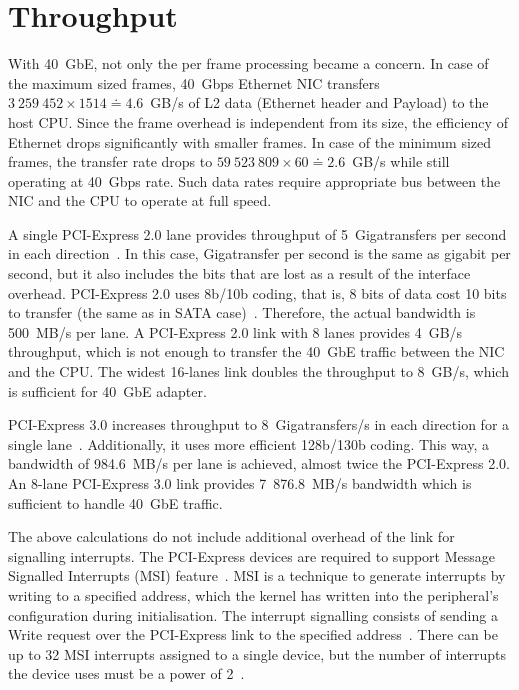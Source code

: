 
\section{Throughput}\label{sec:40gbe-throughput}
With 40~GbE, not only the per frame processing became a concern.
In case of the maximum sized frames,
40~Gbps Ethernet NIC transfers $3~259~452 \times 1514 \doteq 4.6$~GB/s of L2 data
(Ethernet header and Payload) to the host CPU.
Since the frame overhead is independent from its size,
the efficiency of Ethernet drops significantly with smaller frames.
In case of the minimum sized frames, the transfer rate drops to $59~523~809 \times 60 \doteq 2.6$~GB/s
while still operating at 40~Gbps rate.
Such data rates require appropriate bus between the NIC and the CPU to operate at full speed.

A single PCI-Express 2.0 lane provides throughput of 5~Gigatransfers per second in each direction~\cite{pcie-specification}.
In this case, Gigatransfer per second is the same as gigabit per second,
but it also includes the bits that are lost as a result of the interface overhead.
PCI-Express 2.0 uses 8b/10b coding, that is, 8 bits of data cost 10 bits to transfer (the same as in SATA case)~\cite{pcie-bandwidth}.
Therefore, the actual bandwidth is 500~MB/s per lane.
A PCI-Express 2.0 link with 8 lanes provides 4~GB/s throughput,
which is not enough to transfer the 40~GbE traffic between the NIC and the CPU.
The widest 16-lanes link doubles the throughput to 8~GB/s, which is sufficient for 40~GbE adapter.

PCI-Express 3.0 increases throughput to 8~Gigatransfers/s in each direction for a single lane~\cite{pcie-specification}.
Additionally, it uses more efficient 128b/130b coding.
This way, a bandwidth of 984.6~MB/s per lane is achieved, almost twice the PCI-Express 2.0.
An 8-lane PCI-Express 3.0 link provides 7~876.8~MB/s bandwidth which is sufficient to handle 40~GbE traffic.

The above calculations do not include additional overhead of the link for signalling interrupts.
The PCI-Express devices are required to support Message Signalled Interrupts (MSI) feature~\cite{pcie-specification}.
MSI is a technique to generate interrupts by writing to a specified address,
which the kernel has written into the peripheral's configuration during initialisation.
The interrupt signalling consists of sending a Write request over the PCI-Express link
to the specified address~\cite{pcie-tutorial-1}.
There can be up to 32 MSI interrupts assigned to a single device,
but the number of interrupts the device uses must be a power of 2~\cite{msi-driver-guide}.

